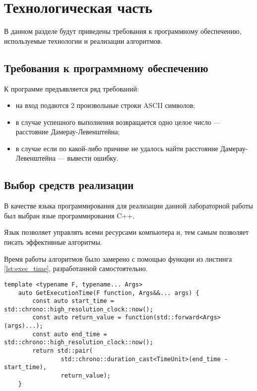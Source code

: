 \chapter{Технологическая часть}

В данном разделе будут приведены требования к программному обеспечению, используемые технологии и реализации алгоритмов.

\section{Требования к программному обеспечению}

К программе предъявляется ряд требований:

\begin{itemize}
	\item на вход подаются 2 произвольные строки ASCII символов;
	\item в случае успешного выполнения возвращается одно целое число — расстояние Дамерау-Левенштейна;
	\item в случае если по какой-либо причине не удалось найти расстояние Дамерау-Левенштейна — вывести ошибку.
\end{itemize}

\section{Выбор средств реализации}

В качестве языка программирования для реализации данной лабораторной работы был выбран язые программирования C++\cite{pythonlang}.

Язык позволяет управлять всеми ресурсами компьютера и, тем самым позволяет
писать эффективные алгоритмы.

Время работы алгоритмов было замерено с помощью функции из листинга \ref{lst:exec_time}, разработанной самостоятельно.

\clearpage
\begin{lstlisting}[label=lst:exec_time, caption=Функция для замера времени исполнения функции]
	template <typename F, typename... Args>
	auto GetExecutionTime(F function, Args&&... args) {
		const auto start_time = std::chrono::high_resolution_clock::now();
		const auto return_value = function(std::forward<Args>(args)...);
		const auto end_time = std::chrono::high_resolution_clock::now();
		return std::pair(
				std::chrono::duration_cast<TimeUnit>(end_time - start_time),
				return_value);
	}
\end{lstlisting}

